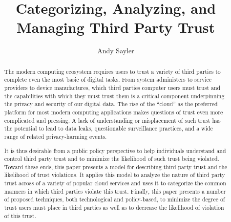 \documentclass[11pt,letterpaper]{article}
\begin{document}
\title{Categorizing, Analyzing, and Managing Third Party Trust}

\author{Andy Sayler}

\date{}

\maketitle

\begin{abstract}

The modern computing ecosystem requires users to trust a variety of
third parties to complete even the most basic of digital tasks.  From
system administers to service providers to device manufactures, which
third parties computer users must trust and the capabilities with
which they must trust them is a critical component underpinning the
privacy and security of our digital data. The rise of the ``cloud'' as
the preferred platform for most modern computing applications makes
questions of trust even more complicated and pressing. A lack of
understanding or misplacement of such trust has the potential to lead
to data leaks, questionable surveillance practices, and a wide range
of related privacy-harming events.

It is thus desirable from a public policy perspective to help
individuals understand and control third party trust and to minimize
the likelihood of such trust being violated. Toward these ends, this
paper presents a model for describing third party trust and the
likelihood of trust violations. It applies this model to analyze the
nature of third party trust across of a variety of popular cloud
services and uses it to categorize the common manners in which third
parties violate this trust. Finally, this paper presents a number of
proposed techniques, both technological and policy-based, to minimize
the degree of trust users must place in third parties as well as to
decrease the likelihood of violation of this trust.

\end{abstract}







\clearpage


\end{document}
